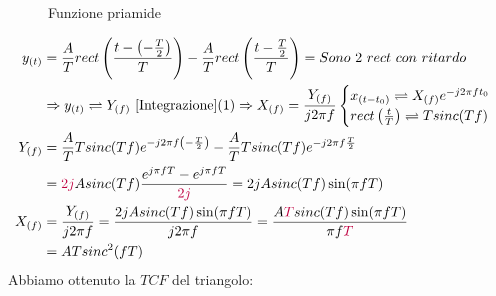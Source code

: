 {\begin{itemize}
{\begin{figure}[H]
                        \caption{Funzione priamide}
                        \label{fig:derivata piramide}
                    \end{figure}
                    \begin{align}
                        y_{(t)} &= \frac{A}{T}rect \left(\frac{t-\left(-\frac{T}{2}\right)}{T}\right) - \frac{A}{T}rect \left(\frac{t-\frac{T}{2}}{T}\right) = Sono\ 2\ rect\ con\ ritardo \nonumber \\
                                &\Rightarrow y_{(t)} \rightleftharpoons Y_{(f)}\ \ref{Integrazione} (1)\Rightarrow X_{(f)}=\frac{Y_{(f)}}{j2\pi f} 
                                \begin{cases}
                                    x_{(t-t_0)} \rightleftharpoons X_{(f)} e^{-j2\pi ft_0}\nonumber\\
                                    rect \left(\frac{t}{T}\right) \rightleftharpoons Tsinc(Tf) \nonumber
                                \end{cases}\nonumber \\
                        Y_{(f)} &= \frac{A}{T}Tsinc(Tf)e^{-j2\pi f\left(-\frac{T}{2}\right)} - \frac{A}{T}Tsinc(Tf)e^{-j2\pi f\frac{T}{2}} \nonumber\\
                                &= {\color{purple}2j}Asinc(Tf)\frac{e^{j\pi fT}-e^{j\pi fT}}{{\color{purple}2j}} = 2jAsinc(Tf)\sin(\pi fT) \nonumber \\
                        X_{(f)} &= \frac{Y_{(f)}}{j2\pi f} = \frac{2jAsinc(Tf)\sin(\pi fT)}{j2\pi f} = \frac{A{\color{purple}T}sinc(Tf)\sin(\pi fT)}{\pi f{\color{purple}T}}\nonumber\\
                                &= ATsinc^2(fT) \nonumber
                    \end{align}
                    Abbiamo ottenuto la $TCF$ del triangolo:
}
\end{itemize}}
